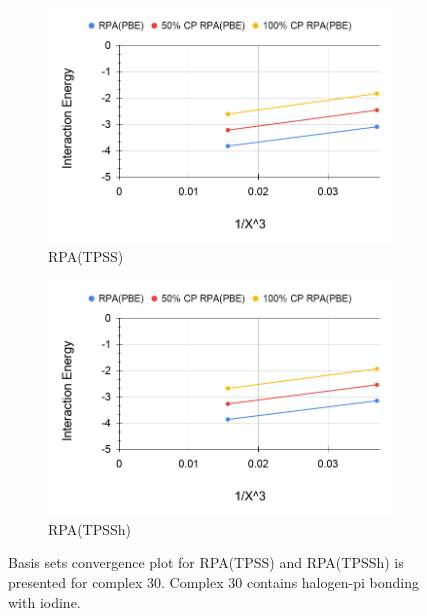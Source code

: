 \documentclass[11pt]{article}
\begin{document}
\begin{figure}[hbpt]
  \centering
  \begin{subfigure}{.5\textwidth}
    \centering
    \includegraphics[scale=0.3]{tpss-30.png}
    \caption{RPA(TPSS)}
    \label{fig:tpss_30}
  \end{subfigure}%
  \begin{subfigure}{.5\textwidth}
    \centering
    \includegraphics[scale=0.3]{tpssh-30.png}
    \caption{RPA(TPSSh)}
    \label{fig:tpssh_30}
  \end{subfigure}
  \caption{Basis sets convergence plot for RPA(TPSS) and RPA(TPSSh) is
    presented for complex 30. Complex 30 contains halogen-pi bonding
    with iodine.}
  \label{fig:complex_30}
\end{figure}
\end{document}
